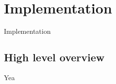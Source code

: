 \chapter{Implementation}
\label{chap:implementation}

Implementation


\section{High level overview}

Yea
